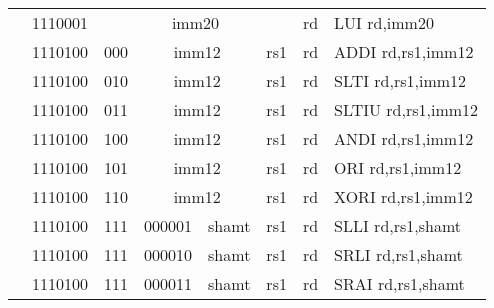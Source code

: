 \begin{table}[p]
\begin{small}
\begin{center}
\begin{tabular}{rcccccccccl}
&
\multicolumn{1}{|c|}{1110001} &
\multicolumn{7}{c|}{imm20} &
\multicolumn{1}{c|}{rd} & LUI rd,imm20 \\
\cline{2-10}
  

&
\multicolumn{1}{|c|}{1110100} &
\multicolumn{2}{c|}{000} &
\multicolumn{4}{c|}{imm12} &
\multicolumn{1}{c|}{rs1} &
\multicolumn{1}{c|}{rd} & ADDI rd,rs1,imm12 \\
\cline{2-10}
  

&
\multicolumn{1}{|c|}{1110100} &
\multicolumn{2}{c|}{010} &
\multicolumn{4}{c|}{imm12} &
\multicolumn{1}{c|}{rs1} &
\multicolumn{1}{c|}{rd} & SLTI rd,rs1,imm12 \\
\cline{2-10}
  

&
\multicolumn{1}{|c|}{1110100} &
\multicolumn{2}{c|}{011} &
\multicolumn{4}{c|}{imm12} &
\multicolumn{1}{c|}{rs1} &
\multicolumn{1}{c|}{rd} & SLTIU rd,rs1,imm12 \\
\cline{2-10}
  

&
\multicolumn{1}{|c|}{1110100} &
\multicolumn{2}{c|}{100} &
\multicolumn{4}{c|}{imm12} &
\multicolumn{1}{c|}{rs1} &
\multicolumn{1}{c|}{rd} & ANDI rd,rs1,imm12 \\
\cline{2-10}
  

&
\multicolumn{1}{|c|}{1110100} &
\multicolumn{2}{c|}{101} &
\multicolumn{4}{c|}{imm12} &
\multicolumn{1}{c|}{rs1} &
\multicolumn{1}{c|}{rd} & ORI rd,rs1,imm12 \\
\cline{2-10}
  

&
\multicolumn{1}{|c|}{1110100} &
\multicolumn{2}{c|}{110} &
\multicolumn{4}{c|}{imm12} &
\multicolumn{1}{c|}{rs1} &
\multicolumn{1}{c|}{rd} & XORI rd,rs1,imm12 \\
\cline{2-10}
  

&
\multicolumn{1}{|c|}{1110100} &
\multicolumn{2}{c|}{111} &
\multicolumn{2}{c|}{000001} &
\multicolumn{2}{c|}{shamt} &
\multicolumn{1}{c|}{rs1} &
\multicolumn{1}{c|}{rd} & SLLI rd,rs1,shamt \\
\cline{2-10}
  

&
\multicolumn{1}{|c|}{1110100} &
\multicolumn{2}{c|}{111} &
\multicolumn{2}{c|}{000010} &
\multicolumn{2}{c|}{shamt} &
\multicolumn{1}{c|}{rs1} &
\multicolumn{1}{c|}{rd} & SRLI rd,rs1,shamt \\
\cline{2-10}
  

&
\multicolumn{1}{|c|}{1110100} &
\multicolumn{2}{c|}{111} &
\multicolumn{2}{c|}{000011} &
\multicolumn{2}{c|}{shamt} &
\multicolumn{1}{c|}{rs1} &
\multicolumn{1}{c|}{rd} & SRAI rd,rs1,shamt \\
\cline{2-10}
  


\end{tabular}
\end{center}
\end{small}
\end{table}
